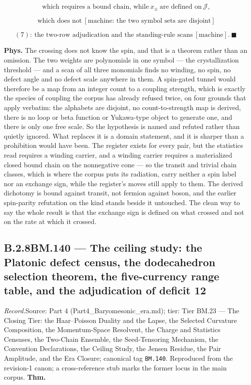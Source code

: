 \documentclass[11pt,openany]{report}
\theoremstyle{canonplain}
\theoremstyle{canondef}
\begin{document}
\[
\ \text{which requires a bound chain, while}\ x_\pm\ \text{are defined on}\ \mathcal J,
\]

\[
\ \text{which does not}\ [\text{machine: the two symbol sets are disjoint}]
\]

\[
(7):\ \text{the two-row adjudication and the standing-rule scans}\ [\text{machine}].\ \blacksquare
\]

\textbf{Phys.} The crossing does not know the spin, and that is a theorem rather than an omission. The two weights are polynomials in one symbol — the crystallization threshold — and a scan of all three monomials finds no winding, no spin, no defect angle and no defect scale anywhere in them. A spin-gated tunnel would therefore be a map from an integer count to a coupling strength, which is exactly the species of coupling the corpus has already refused twice, on four grounds that apply verbatim: the alphabets are disjoint, no count-to-strength map is derived, there is no loop or beta function or Yukawa-type object to generate one, and there is only one free scale. So the hypothesis is named and refuted rather than quietly ignored. What replaces it is a domain statement, and it is sharper than a prohibition would have been. The register exists for every pair, but the statistics read requires a winding carrier, and a winding carrier requires a materialized closed bound chain on the nonnegative cone — so the transit and trivial chain classes, which is where the corpus puts its radiation, carry neither a spin label nor an exchange sign, while the register's moves still apply to them. The derived dichotomy is bound against transit, not fermion against boson, and the earlier spin-parity refutation on the kind stands beside it untouched. The clean way to say the whole result is that the exchange sign is defined on what crossed and not on the rate at which it crossed.

\medskip
\subsection*{\texorpdfstring{B.2.8\quad BM.140 — The ceiling study: the Platonic defect census, the dodecahedron selection theorem, the five-currency range table, and the adjudication of deficit 12}{BM.140 B.2.8}}
\label{tag:BM-140}
{\small \textit{Record.}\quad Source: Part 4 (Part4\_Baryomesonic\_era.md); tier: Tier BM.23 — The Closing Tier: the Haar–Poisson Duality and the Lapse, the Selected Curvature Composition, the Momentum-Space Resolvent, the Charge and Statistics Censuses, the Two-Chain Ensemble, the Seed-Tensoring Mechanism, the Convention Declarations, the Ceiling Study, the Jensen Residue, the Pair Amplitude, and the Era Closure; canonical tag \texttt{BM.140}. Reproduced from the revision-1 canon; a cross-reference stub marks the former locus in the main corpus.}
\medskip
\textbf{Thm.}
\end{document}
